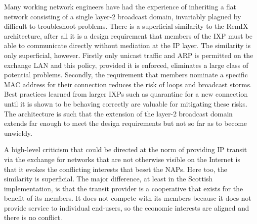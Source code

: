 Many working network engineers have had the experience of inheriting a
flat network consisting of a single layer-2 broadcast domain,
invariably plagued by difficult to troubleshoot problems. There is a
superficial similarity to the RemIX architecture, after all it is a
design requirement that members of the \ac{IXP} must be able to
communicate directly without mediation at the IP layer. The similarity
is only superficial, however. Firstly only unicast traffic and
\ac{ARP} is permitted on the exchange \ac{LAN} and this policy,
provided it is enforced, eliminates a large class of potential
problems. Secondly, the requirement that members nominate a specific
\ac{MAC} address for their connection reduces the risk of loops and
broadcast storms. Best practices learned from larger \acp{IXP} such as
quarantine for a new connection until it is shown to be behaving
correctly are valuable for mitigating these risks. The architecture is
such that the extension of the layer-2 broadcast domain extends far
enough to meet the design requirements but not so far as to become
unwieldy.

A high-level criticism that could be directed at the norm of providing
IP transit via the exchange for networks that are not otherwise
visible on the Internet is that it evokes the conflicting interests
that beset the \acp{NAP}. Here too, the similarity is superficial. The
major difference, at least in the Scottish implementation, is that the
transit provider is a cooperative that exists for the benefit of its
members. It does not compete with its members because it does not
provide service to individual end-users, so the economic interests are
aligned and there is no conflict.


